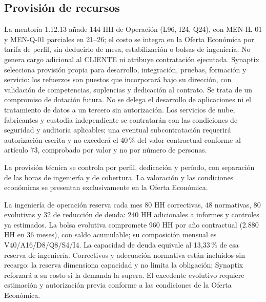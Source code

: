 \subsection{Provisión de recursos}
La mentoría 1.12.13 añade 144 HH de Operación (L96, I24, Q24), con MEN-IL-01 y MEN-Q-01 parciales en 21--26; el costo se integra en la Oferta Económica por tarifa de perfil, sin deducirlo de mesa, estabilización o bolsas de ingeniería. No genera cargo adicional al CLIENTE ni atribuye contratación ejecutada.
Synaptix selecciona provisión propia para desarrollo, integración, pruebas, formación y servicio: los refuerzos son puestos que incorporará bajo su dirección, con validación de competencias, suplencias y dedicación al contrato. Se trata de un compromiso de dotación futura. No se delega el desarrollo de aplicaciones ni el tratamiento de datos a un tercero sin autorización. Los servicios de nube, fabricantes y custodia independiente se contratarán con las condiciones de seguridad y auditoría aplicables; una eventual subcontratación requerirá autorización escrita y no excederá el 40\,\% del valor contractual conforme al artículo 73, comprobado por valor y no por número de personas.

La provisión técnica se controla por perfil, dedicación y período, con separación de las horas de ingeniería y de cobertura. La valoración y las condiciones económicas se presentan exclusivamente en la Oferta Económica.

La ingeniería de operación reserva cada mes 80 HH correctivas, 48 normativas, 80 evolutivas y 32 de reducción de deuda: 240 HH adicionales a informes y controles ya estimados. La bolsa evolutiva compromete 960 HH por año contractual (2.880 HH en 36 meses), con saldo acumulable; su composición mensual es V40/A16/D8/Q8/S4/I4. La capacidad de deuda equivale al 13,33\,\% de esa reserva de ingeniería. Correctivos y adecuación normativa están incluidos sin recargo: la reserva dimensiona capacidad y no limita la obligación; Synaptix reforzará a su costo si la demanda la supera. El excedente evolutivo requiere estimación y autorización previa conforme a las condiciones de la Oferta Económica.~\parencite[RT-21.19--22; pp.~35--38]{bases-transversales}~\parencite[art.~73; Formulario E-26; pp.~38--76]{bases-admin}
